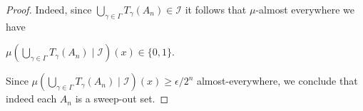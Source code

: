 \documentclass[10pt,a4paper]{amsart}
\begin{document}
\begin{proof}
Indeed, since $\bigcup_{\gamma \in \Gamma}T_\gamma(A_n) \in \mathcal{I}$ it follows that $\mu$-almost everywhere we have

$\mu( \bigcup_{\gamma \in \Gamma}T_\gamma(A_n) \mid \mathcal{I}) (x)\in \{0,1\}$.

Since $\mu( \bigcup_{\gamma \in \Gamma}T_\gamma(A_n) \mid \mathcal{I}) (x) \ge \epsilon/2^n$ almost-everywhere, we conclude that indeed
 each $A_n$ is a sweep-out set.



\end{proof}
\end{document}
